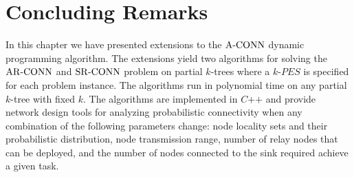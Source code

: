 \section{Concluding Remarks}
In this chapter we have presented extensions to the ${\mathrm {A\mbox{-}CONN}}$ dynamic programming algorithm. The extensions yield two algorithms for solving the ${\mathrm {AR\mbox{-}CONN}}$ and ${\mathrm {SR\mbox{-}CONN}}$ problem on partial $k$-trees where a $k$-$PES$ is specified for each problem instance. The algorithms run in polynomial time on any partial $k$-tree with fixed $k$. The algorithms are implemented in $C\mbox{++}$ and provide network design tools for analyzing probabilistic connectivity when any combination of the following parameters change: node locality sets and their probabilistic distribution, node transmission range, number of relay nodes that can be deployed, and the number of nodes connected to the sink required achieve a given task.  
